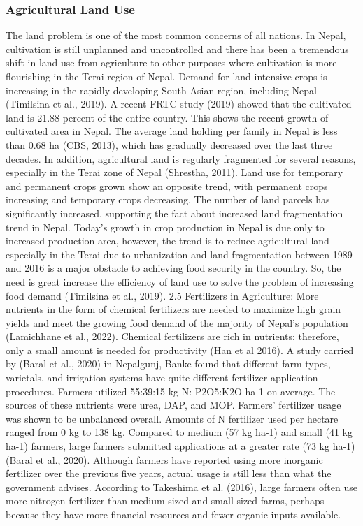 \subsubsection{Agricultural Land Use}
The land problem is one of the most common concerns of all nations. In Nepal, cultivation is still unplanned and uncontrolled and there has been a tremendous shift in land use from agriculture to other purposes where cultivation is more flourishing in the Terai region of Nepal. Demand for land-intensive crops is increasing in the rapidly developing South Asian region, including Nepal (Timilsina et al., 2019). A recent FRTC study (2019) showed that the cultivated land is 21.88 percent of the entire country. This shows the recent growth of cultivated area in Nepal. The average land holding per family in Nepal is less than 0.68 ha (CBS, 2013), which has gradually decreased over the last three decades. In addition, agricultural land is regularly fragmented for several reasons, especially in the Terai zone of Nepal (Shrestha, 2011). Land use for temporary and permanent crops grown show an opposite trend, with permanent crops increasing and temporary crops decreasing. The number of land parcels has significantly increased, supporting the fact about increased land fragmentation trend in Nepal.
Today's growth in crop production in Nepal is due only to increased production area, however, the trend is to reduce agricultural land especially in the Terai due to urbanization and land fragmentation between 1989 and 2016 is a major obstacle to achieving food security in the country. So, the need is great increase the efficiency of land use to solve the problem of increasing food demand (Timilsina et al., 2019). 
2.5 Fertilizers in Agriculture:
More nutrients in the form of chemical fertilizers are needed to maximize high grain yields and meet the growing food demand of the majority of Nepal's population (Lamichhane et al., 2022). Chemical fertilizers are rich in nutrients; therefore, only a small amount is needed for productivity (Han et al 2016). A study carried by (Baral et al., 2020) in Nepalgunj, Banke found that different farm types, varietals, and irrigation systems have quite different fertilizer application procedures. Farmers utilized 55:39:15 kg N: P2O5:K2O ha-1 on average. The sources of these nutrients were urea, DAP, and MOP. Farmers' fertilizer usage was shown to be unbalanced overall. Amounts of N fertilizer used per hectare ranged from 0 kg to 138 kg. Compared to medium (57 kg ha-1) and small (41 kg ha-1) farmers, large farmers submitted applications at a greater rate (73 kg ha-1) (Baral et al., 2020). Although farmers have reported using more inorganic fertilizer over the previous five years, actual usage is still less than what the government advises. According to Takeshima et al. (2016), large farmers often use more nitrogen fertilizer than medium-sized and small-sized farms, perhaps because they have more financial resources and fewer organic inputs available.
